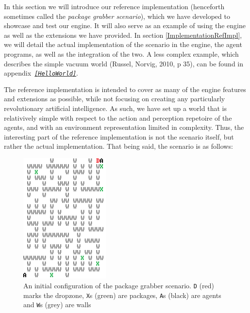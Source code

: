 In this section we will introduce our reference implementation (henceforth
sometimes called the \emph{package grabber scenario}), which we have
developed to showcase and test our engine. It will also serve as an
example of using the engine as well as the extensions we have provided.
In section \ref{ImplementationRefImpl}, we will detail the actual
implementation of the scenario in the engine, the agent programs,
as well as the integration of the two. A less complex example, which
describes the simple vacuum world (Russel, Norvig, 2010, p 35), can
be found in appendix\texttt{\emph{ \ref{HelloWorld}}}.

The reference implementation is intended to cover as many of the engine
features and extensions as possible, while not focusing on creating
any particularly revolutionary artificial intelligence. As such, we
have set up a world that is relativively simple with respect to the
action and perception repetoire of the agents, and with an environment
representation limited in complexity. Thus, the interesting part of
the reference implementation is not the scenario itself, but rather
the actual implementation. That being said, the scenario is as follows:

\begin{figure}
\begin{centering}
\includegraphics[width=0.4\textwidth]{TileWorldColoredScrot}
\par\end{centering}

\caption{An initial configuration of the package grabber scenario. \texttt{D}
(red) marks the dropzone, \texttt{X}s (green) are packages, \texttt{A}s
(black) are agents and \texttt{W}s (grey) are walls\label{fig:maze-scrot}}
\end{figure}


